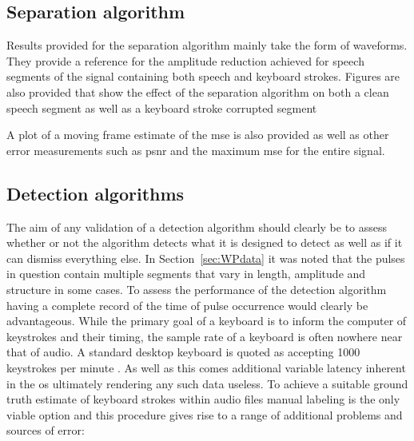 \subsection{Separation algorithm}
Results provided for the separation algorithm mainly take the form of waveforms. They provide a reference for the amplitude reduction achieved for speech segments of the signal containing both speech and keyboard strokes. Figures are also provided that show the effect of the separation algorithm on both a clean speech segment as well as a keyboard stroke corrupted segment \DIFdelbegin {}\DIFdelend \DIFaddbegin {}\DIFaddend

A plot of a moving frame estimate of the \DIFdelbegin {}\DIFdelend \DIFaddbegin \gls{mse} \DIFaddend is also provided \DIFaddbegin {}\DIFaddend as well as other error measurements such as \DIFdelbegin {}\DIFdelend \DIFaddbegin \gls{psnr} \DIFaddend and the maximum \DIFdelbegin {}\DIFdelend \DIFaddbegin \gls{mse} \DIFaddend for the entire signal.

\subsection{Detection algorithms}
The aim of any validation of a detection algorithm should clearly be to assess whether or not the algorithm detects what it is designed to detect as well as if it can dismiss everything else. In Section~\ref{sec:WPdata} it was noted that the pulses in question contain multiple segments that vary in length, amplitude and structure in some cases. To assess the performance of the detection algorithm having a complete record of the time of pulse occurrence would clearly be advantageous. While the primary goal of a keyboard is to inform the computer of keystrokes and their timing, the sample rate of a keyboard is often nowhere near that of audio. A standard desktop keyboard is quoted as accepting 1000 keystrokes per minute \cite{MSCurveKeyboard3000}. As well as this comes additional variable latency inherent in the \DIFdelbegin {}\DIFdelend \DIFaddbegin \gls{os} \DIFaddend ultimately rendering any such data useless. To achieve a suitable ground truth estimate of keyboard strokes within audio files manual labeling is the only viable option and this procedure gives rise to a range of additional problems and sources of error:

